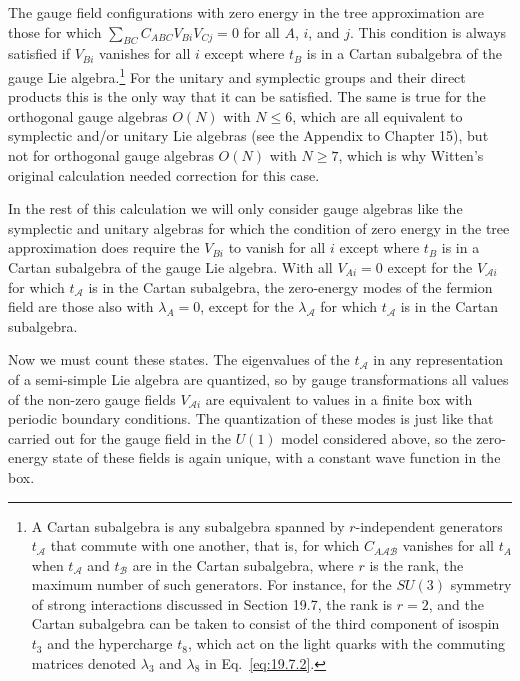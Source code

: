 The gauge field configurations with zero energy in the tree approximation
are those for which \(\sum_{BC}C_{ABC}V_{Bi}V_{Cj}=0\) for all \(A\),
\(i\), and \(j\). This condition is always satisfied if \(V_{Bi}\) vanishes
for all \(i\) except where \(t_B\) is in a Cartan subalgebra of the gauge
Lie algebra.\footnote{A Cartan subalgebra is any subalgebra spanned by
\(r\)-independent generators \(t_{\mathcal A}\) that commute with one
another, that is, for which \(C_{A\mathcal A\mathcal B}\) vanishes for all
\(t_A\) when \(t_{\mathcal A}\) and \(t_{\mathcal B}\) are in the Cartan
subalgebra, where \(r\) is the rank, the maximum number of such generators.
For instance, for the \(SU(3)\) symmetry of strong interactions discussed
in Section 19.7, the rank is \(r=2\), and the Cartan subalgebra can be
taken to consist of the third component of isospin \(t_3\) and the
hypercharge \(t_8\), which act on the light quarks with the commuting
matrices denoted \(\lambda_3\) and \(\lambda_8\) in
Eq.~\eqref{eq:19.7.2}.} For the unitary and symplectic groups and their
direct products this is the only way that it can be satisfied. The same is
true for the orthogonal gauge algebras \(O(N)\) with \(N\leq6\), which are
all equivalent to symplectic and/or unitary Lie algebras (see the Appendix
to Chapter 15), but not for orthogonal gauge algebras \(O(N)\) with
\(N\geq7\), which is why Witten's original calculation needed correction
for this case.

In the rest of this calculation we will only consider gauge algebras like
the symplectic and unitary algebras for which the condition of zero energy
in the tree approximation does require the \(V_{Bi}\) to vanish for all
\(i\) except where \(t_B\) is in a Cartan subalgebra of the gauge Lie
algebra. With all \(V_{Ai}=0\) except for the \(V_{\mathcal A i}\) for
which \(t_{\mathcal A}\) is in the Cartan subalgebra, the zero-energy modes
of the fermion field are those also with \(\lambda_A=0\), except for the
\(\lambda_{\mathcal A}\) for which \(t_{\mathcal A}\) is in the Cartan
subalgebra.

Now we must count these states. The eigenvalues of the \(t_{\mathcal A}\)
in any representation of a semi-simple Lie algebra are quantized, so by
gauge transformations all values of the non-zero gauge fields
\(V_{\mathcal A i}\) are equivalent to values in a finite box with periodic
boundary conditions. The quantization of these modes is just like that
carried out for the gauge field in the \(U(1)\) model considered above, so
the zero-energy state of these fields is again unique, with a constant wave
function in the box.

